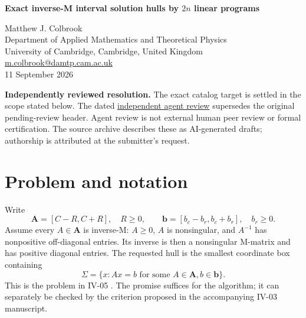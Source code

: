 \documentclass[11pt,a4paper]{article}
\theoremstyle{remark}\newtheorem{remark}[theorem]{Remark}
\newcommand{\header}[2]{\begin{center}{\Large\bfseries #1\par}\vspace{6pt}{\small #2\par}\end{center}\vspace{6pt}}
\begin{document}
\header{Exact inverse-M interval solution hulls by $2n$ linear programs}{Repository IV-05. Claimed resolution; independent review pending.}
\begin{center}Matthew J. Colbrook\\{\small Department of Applied Mathematics and Theoretical Physics\\University of Cambridge, Cambridge, United Kingdom\\\href{mailto:m.colbrook@damtp.cam.ac.uk}{m.colbrook@damtp.cam.ac.uk}}\\11 September 2026\end{center}
\textbf{Independently reviewed resolution.} The exact catalog target is settled in the scope stated below.
The dated \href{https://github.com/MColbrook/OpenProblemsInNLA/blob/codex/colbrook-package-submissions/references/colbrook-intervals-2026-09-11/verification/reviews/IV-05-review.md}{independent agent review} supersedes the original pending-review header. Agent review is not external human peer review or formal certification. The source archive describes these as AI-generated drafts; authorship is attributed at the submitter's request.
\par\medskip
\begin{abstract}
For a rational interval matrix whose every member is inverse-M, and an arbitrary rational interval right-hand side, we compute the exact solution hull using $2n$ linear programs with $n$ variables and $2n$ inequalities each. A complementary-parts linear program solves the relevant absolute value equations. A sign argument using the inverse-M promise proves that their solutions are attained coordinatewise hull endpoints. All claims are in exact rational bit complexity; floating-point test code is supplementary only.
\end{abstract}
\section{Problem and notation}
Write
\[
 \boldsymbol A=[C-R,C+R],\quad R\ge0,\qquad
 \boldsymbol b=[b_c-b_r,b_c+b_r],\quad b_r\ge0.
\]
Assume every $A\in\boldsymbol A$ is inverse-M: $A\ge0$, $A$ is nonsingular, and $A^{-1}$ has nonpositive off-diagonal entries. Its inverse is then a nonsingular M-matrix and has positive diagonal entries. The requested hull is the smallest coordinate box containing
\[
 \Sigma=\{x:Ax=b\text{ for some }A\in\boldsymbol A,
                                  b\in\boldsymbol b\}.
\]
This is the problem in IV-05 \cite{repo,overview}. The promise suffices for the algorithm; it can separately be checked by the criterion proposed in the accompanying IV-03 manuscript.
\end{document}
